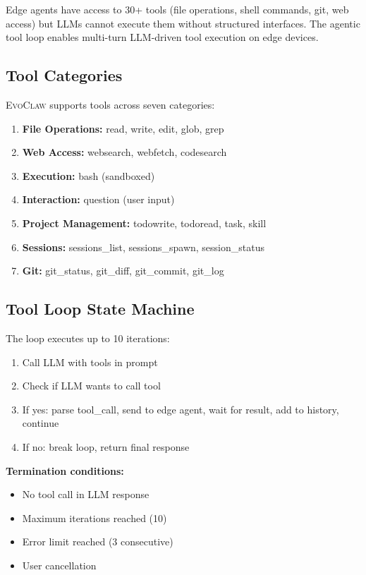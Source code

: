 \documentclass{article}
\newcommand{\evoclaw}{\textsc{EvoClaw}}
\begin{document}
Edge agents have access to 30+ tools (file operations, shell commands, git, web access) but LLMs cannot execute them without structured interfaces. The agentic tool loop enables multi-turn LLM-driven tool execution on edge devices.

\subsection{Tool Categories}

\evoclaw{} supports tools across seven categories:

\begin{enumerate}[leftmargin=*]
    \item \textbf{File Operations:} read, write, edit, glob, grep
    \item \textbf{Web Access:} websearch, webfetch, codesearch
    \item \textbf{Execution:} bash (sandboxed)
    \item \textbf{Interaction:} question (user input)
    \item \textbf{Project Management:} todowrite, todoread, task, skill
    \item \textbf{Sessions:} sessions\_list, sessions\_spawn, session\_status
    \item \textbf{Git:} git\_status, git\_diff, git\_commit, git\_log
\end{enumerate}

\subsection{Tool Loop State Machine}

The loop executes up to 10 iterations:

\begin{enumerate}[leftmargin=*]
    \item Call LLM with tools in prompt
    \item Check if LLM wants to call tool
    \item If yes: parse tool\_call, send to edge agent, wait for result, add to history, continue
    \item If no: break loop, return final response
\end{enumerate}

\textbf{Termination conditions:}
\begin{itemize}[leftmargin=*]
    \item No tool call in LLM response
    \item Maximum iterations reached (10)
    \item Error limit reached (3 consecutive)
    \item User cancellation
\end{itemize}
\end{document}
